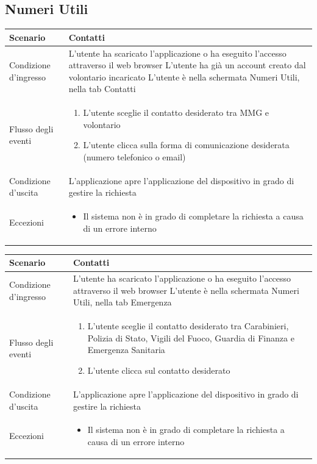 \documentclass[12pt,a4paper,twoside,openright,titlepage]{book}
\begin{document}
\subsection{Numeri Utili}
\begin{table}[H]
\centering
\begin{tabular}{|p{4cm}|p{10cm}|}
\hline
Scenario & Contatti \\
\hline
Condizione d'ingresso & L'utente ha scaricato l'applicazione o ha eseguito l'accesso attraverso il web browser\newline
L'utente ha già un account creato dal volontario incaricato\newline
L'utente è nella schermata Numeri Utili, nella tab Contatti\\
\hline
Flusso degli eventi & 
\begin{enumerate}
\item L'utente sceglie il contatto desiderato tra MMG e volontario
\item L'utente clicca sulla forma di comunicazione desiderata (numero telefonico o email)
\end{enumerate}\\
\hline
Condizione d'uscita & L'applicazione apre l'applicazione del dispositivo in grado di gestire la richiesta\\
\hline
Eccezioni & 
\begin{itemize}
\item Il sistema non è in grado di completare la richiesta a causa di un errore interno
\end{itemize} \\
\hline
\end{tabular}
\end{table}

\begin{table}[H]
\centering
\begin{tabular}{|p{4cm}|p{10cm}|}
\hline
Scenario & Contatti \\
\hline
Condizione d'ingresso & L'utente ha scaricato l'applicazione o ha eseguito l'accesso attraverso il web browser\newline
L'utente è nella schermata Numeri Utili, nella tab Emergenza\\
\hline
Flusso degli eventi & 
\begin{enumerate}
\item L'utente sceglie il contatto desiderato tra Carabinieri, Polizia di Stato, Vigili del Fuoco, Guardia di Finanza e Emergenza Sanitaria
\item L'utente clicca sul contatto desiderato
\end{enumerate}\\
\hline
Condizione d'uscita & L'applicazione apre l'applicazione del dispositivo in grado di gestire la richiesta\\
\hline
Eccezioni & 
\begin{itemize}
\item Il sistema non è in grado di completare la richiesta a causa di un errore interno
\end{itemize} \\
\hline
\end{tabular}
\end{table}
\end{document}
